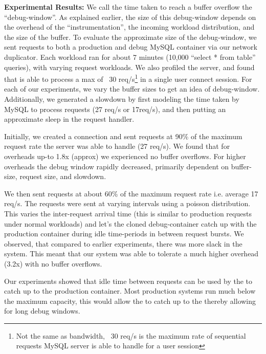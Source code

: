 \noindent
\textbf{Experimental Results:} We call the time taken to reach a buffer overflow the ``debug-window''.
As explained earlier, the size of this debug-window depends on the overhead of the ``instrumentation'', the incoming workload distribution, and the size of the buffer.
To evaluate the approximate size of the debug-window, we sent requests to both a production and debug MySQL container via our network duplicator.
Each workload ran for about 7 minutes (10,000 ``select * from table'' queries), with varying request workloads.
We also profiled the server, and found that is able to process a max of ~30 req/s\footnote{Not the same as bandwidth, ~30 req/s is the maximum rate of sequential requests MySQL server is able to handle for a user session} in a single user connect session. 
For each of our experiments, we vary the buffer sizes to get an idea of debug-window. 
Additionally, we generated a slowdown by first modeling the time taken by MySQL to process requests (27 req/s or 17req/s), and then putting an approximate sleep in the request handler.

Initially, we created a connection and sent requests at 90\% of the maximum request rate the server was able to handle (27 req/s).
We found that for overheads up-to 1.8x (approx) we experienced no buffer overflows.
For higher overheads the debug window rapidly decreased, primarily dependent on buffer-size, request size, and slowdown.

We then sent requests at about 60\% of the maximum request rate i.e. average 17 req/s. 
The requests were sent at varying intervals using a poisson distribution. 
This varies the inter-request arrival time (this is similar to production requests under normal workloads) and let's the cloned debug-container catch up with the production container during idle time-periods in between request bursts.
We observed, that compared to earlier experiments, there was more slack in the system. 
This meant that our system was able to tolerate a much higher overhead (3.2x) with no buffer overflows.

Our experiments showed that idle time between requests can be used by the \debugcontainer to catch up to the production container. 
Most production systems run much below the maximum capacity, this would allow the \debugcontainer to catch up to the \productioncontainer thereby allowing for long debug windows.


